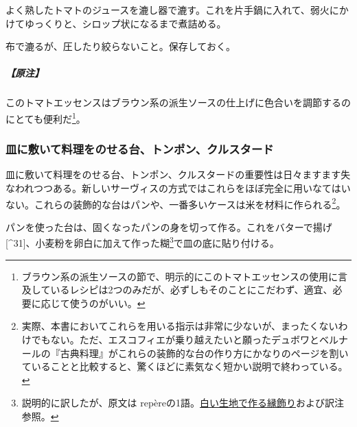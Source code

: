 \begin{recette}
よく熟したトマトのジュースを漉し器で漉す。これを片手鍋に入れて、弱火にかけてゆっくりと、シロップ状になるまで煮詰める。

布で漉るが、圧したり絞らないこと。保存しておく。

\hypertarget{nota-essence-de-tomate}{%
\subparagraph{【原注】}\label{nota-essence-de-tomate}}

このトマトエッセンスはブラウン系の派生ソースの仕上げに色合いを調節するのにとても便利だ\footnote{ブラウン系の派生ソースの節で、明示的にこのトマトエッセンスの使用に言及しているレシピは2つのみだが、必ずしもそのことにこだわず、適宜、必要に応じて使うのがいい。}。

\hypertarget{fonds-de-plats}{%
\subsubsection{皿に敷いて料理をのせる台、トンポン、クルスタード}\label{fonds-de-plats}}


 
 

皿に敷いて料理をのせる台、トンポン、クルスタードの重要性は日々ますます失なわれつつある。新しいサーヴィスの方式ではこれらをほぼ完全に用いなてはいない。これらの装飾的な台はパンや、一番多いケースは米を材料に作られる\footnote{実際、本書においてこれらを用いる指示は非常に少ないが、まったくないわけでもない。ただ、エスコフィエが乗り越えたいと願ったデュボワとベルナールの『古典料理』がこれらの装飾的な台の作り方にかなりのページを割いていることと比較すると、驚くほどに素気なく短かい説明で終わっている。}。

パンを使った台は、固くなったパンの身を切って作る。これをバターで揚げ
{[}\^{}31{]}、小麦粉を卵白に加えて作った糊\footnote{説明的に訳したが、原文は
  repèreの1語。\protect\hyperlink{bordures-en-pate-blanche}{白い生地で作る縁飾り}および訳注参照。}で皿の底に貼り付ける。


\end{recette}
